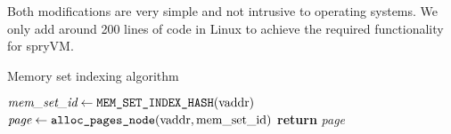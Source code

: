Both modifications are very simple and not intrusive to operating systems. We only add around 200 lines of code in Linux to achieve the required functionality for spryVM. 

\begin{algorithm}
  \caption{Memory set indexing algorithm}\label{alg:index}
  \begin{algorithmic}[1]
    \State $\textit{mem\_set\_id} \gets \verb|MEM_SET_INDEX_HASH|(\mbox{vaddr})$
    \State $\textit{page} \gets \verb|alloc_pages_node|(\mbox{vaddr}, \mbox{mem\_set\_id})$
    \State \textbf{return} \textit{page}
    \EndProcedure
  \end{algorithmic}
\end{algorithm}